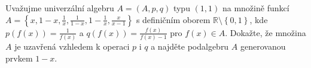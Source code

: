 Uvažujme univerzální algebru $A=(A,p,q)$ typu $(1,1)$ na množině funkcí $A=\left
\{ x,1-x,\frac{1}{x},\frac{1}{1-x},1-\frac{1}{x},\frac{x}{x-1} \right \}$ s
definičním oborem $\mathbb{R} \setminus \left \{ 0,1 \right \}$, kde
$p(f(x))=\frac{1}{f(x)}$ a $q(f(x))=\frac{f(x)}{f(x)-1}$ pro $f(x) \in A$.
Dokažte, že množina $A$ je uzavřená vzhledem k operaci $p$ i $q$ a najděte
podalgebru $A$ generovanou prvkem $1-x$.
